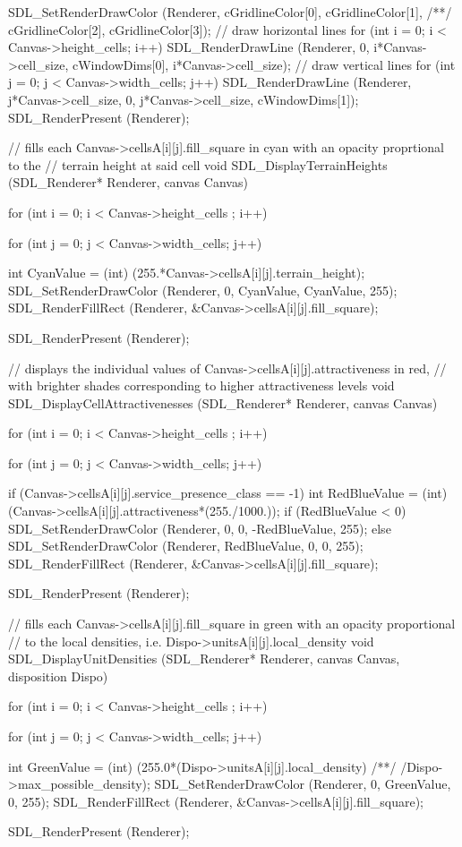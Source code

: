 \begin{C}
{	SDL_SetRenderDrawColor (Renderer, cGridlineColor[0], cGridlineColor[1],
	/**/ cGridlineColor[2], cGridlineColor[3]);
	// draw horizontal lines
	for (int i = 0; i < Canvas->height_cells; i++)
	SDL_RenderDrawLine (Renderer, 0, i*Canvas->cell_size, cWindowDims[0], i*Canvas->cell_size);
	// draw vertical lines
	for (int j = 0; j < Canvas->width_cells; j++)
	SDL_RenderDrawLine (Renderer, j*Canvas->cell_size, 0, j*Canvas->cell_size, cWindowDims[1]);
	SDL_RenderPresent (Renderer);
}


// fills each Canvas->cellsA[i][j].fill_square in cyan with an opacity proprtional to the
// terrain height at said cell
void SDL_DisplayTerrainHeights (SDL_Renderer* Renderer, canvas Canvas){
	
	for (int i = 0; i < Canvas->height_cells ; i++){
		for (int j = 0; j < Canvas->width_cells; j++){
			
			int CyanValue = (int) (255.*Canvas->cellsA[i][j].terrain_height);
			SDL_SetRenderDrawColor (Renderer, 0, CyanValue, CyanValue, 255);
			SDL_RenderFillRect (Renderer, &Canvas->cellsA[i][j].fill_square);
		}
	}
	SDL_RenderPresent (Renderer);
}


// displays the individual values of Canvas->cellsA[i][j].attractiveness in red,
// with brighter shades corresponding to higher attractiveness levels
void SDL_DisplayCellAttractivenesses (SDL_Renderer* Renderer, canvas Canvas){
	
	for (int i = 0; i < Canvas->height_cells ; i++){
		for (int j = 0; j < Canvas->width_cells; j++){
			
			if (Canvas->cellsA[i][j].service_presence_class == -1){
				int RedBlueValue = (int) (Canvas->cellsA[i][j].attractiveness*(255./1000.));
				if (RedBlueValue < 0){
					SDL_SetRenderDrawColor (Renderer, 0, 0, -RedBlueValue, 255);
				}
				else
				SDL_SetRenderDrawColor (Renderer, RedBlueValue, 0, 0, 255);
				SDL_RenderFillRect (Renderer, &Canvas->cellsA[i][j].fill_square);
			}
		}
	}
	SDL_RenderPresent (Renderer);
}


// fills each Canvas->cellsA[i][j].fill_square in green with an opacity proportional
// to the local densities, i.e. Dispo->unitsA[i][j].local_density
void SDL_DisplayUnitDensities (SDL_Renderer* Renderer, canvas Canvas, disposition Dispo){
	
	for (int i = 0; i < Canvas->height_cells ; i++){
		for (int j = 0; j < Canvas->width_cells; j++){
			
			int GreenValue = (int) (255.0*(Dispo->unitsA[i][j].local_density)
			/**/ /Dispo->max_possible_density);
			SDL_SetRenderDrawColor (Renderer, 0, GreenValue, 0, 255);
			SDL_RenderFillRect (Renderer, &Canvas->cellsA[i][j].fill_square);
		}
	}
	SDL_RenderPresent (Renderer);
}



\end{C}
